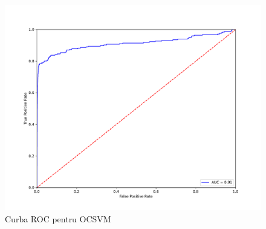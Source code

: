 \begin{figure}[!htb]
    \begin{minipage}[t]{1\textwidth}
       \centering
        \includegraphics[width=\textwidth]{images/ocsvm-roc.pdf}
        \caption{Curba ROC pentru OCSVM}
    \end{minipage}
    
\end{figure}

\noindent
